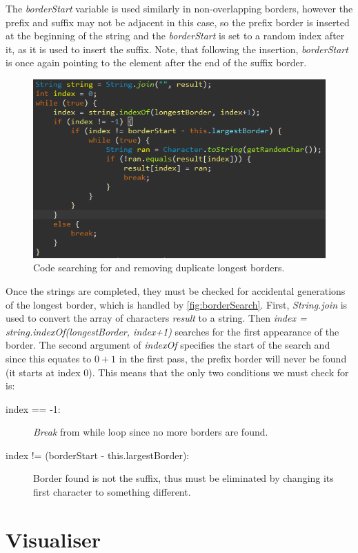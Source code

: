 \documentclass{l4proj}
\begin{document}
The \emph{borderStart} variable is used similarly in non-overlapping borders, however the prefix and suffix may not be adjacent in this case, so the prefix border is inserted at the beginning of the string and the \emph{borderStart} is set to a random index after it, as it is used to insert the suffix. Note, that following the insertion, \emph{borderStart} is once again pointing to the element after the end of the suffix border.

\begin{figure}
    \centering
    \includegraphics[width=0.7\linewidth]{images/borderSearch.png}    

    \caption{Code searching for and removing duplicate longest borders.}
    \label{fig:borderSearch} 
\end{figure}

Once the strings are completed, they must be checked for accidental generations of the longest border, which is handled by \autoref{fig:borderSearch}. First, \emph{String.join} is used to convert the array of characters \emph{result} to a string. Then \emph{index = string.indexOf(longestBorder, index+1)} searches for the first appearance of the border. The second argument of \emph{indexOf} specifies the start of the search and since this equates to $0+1$ in the first pass, the prefix border will never be found (it starts at index $0$). This means that the only two conditions we must check for is:

\begin{description}
	\item[index == -1:]
 	\emph{Break} from while loop since no more borders are found.
	\item[index != (borderStart - this.largestBorder):] 
	Border found is not the suffix, thus must be eliminated by changing its first character to something different.
\end{description}

\section{Visualiser}
\end{document}
